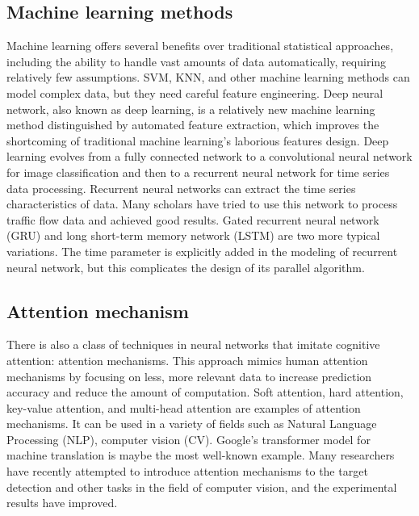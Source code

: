 \documentclass[conference]{IEEEtran}
\begin{document}
\subsection{Machine learning methods}
Machine learning offers several benefits over traditional statistical approaches, including the ability to handle vast amounts of data automatically, requiring relatively few assumptions. SVM, KNN, and other machine learning methods can model complex data, but they need careful feature engineering. Deep neural network, also known as deep learning, is a relatively new machine learning method distinguished by automated feature extraction, which improves the shortcoming of traditional machine learning's laborious features design. Deep learning evolves from a fully connected network to a convolutional neural network for image classification and then to a recurrent neural network for time series data processing. Recurrent neural networks can extract the time series characteristics of data. Many scholars have tried to use this network to process traffic flow data and achieved good results. Gated recurrent neural network (GRU) and long short-term memory network (LSTM) are two more typical variations. The time parameter is explicitly added in the modeling of recurrent neural network, but this complicates the design of its parallel algorithm. 

\subsection{Attention mechanism}
There is also a class of techniques in neural networks that imitate cognitive attention: attention mechanisms. This approach mimics human attention mechanisms by focusing on less, more relevant data to increase prediction accuracy and reduce the amount of computation. Soft attention, hard attention, key-value attention, and multi-head attention are examples of attention mechanisms. It can be used in a variety of fields such as Natural Language Processing (NLP),  computer vision (CV). Google's transformer model for machine translation is maybe the most well-known example. Many researchers have recently attempted to introduce attention mechanisms to the target detection and other tasks in the field of computer vision, and the experimental results have improved.
\end{document}
